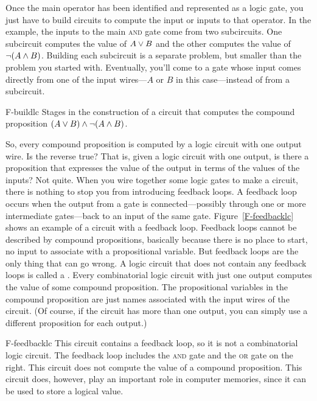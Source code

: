 Once the main operator has been identified and represented as
a logic gate, you just have to build circuits to compute the
input or inputs to that operator.  In the  example,
the inputs to the main \textsc{and} gate come from two subcircuits.
One subcircuit computes the value of $A\vee B$ and the other
computes the value of $\lnot(A\wedge B)$.  Building each subcircuit
is a separate problem, but smaller than the problem you started
with.  Eventually, you'll come to a gate whose input comes directly
from one of the input wires---$A$ or $B$ in this case---instead of
from a subcircuit.


\fig
   {F-buildlc}
   {Stages in the construction of a circuit that computes
    the compound proposition $(A\vee B)\wedge\lnot(A\wedge B)$.}
   {}
   
\medbreak
   
So, every compound proposition is computed by a logic circuit
with one output wire.  Is the reverse true?  That is, given
a logic circuit with one output, is there a proposition that
expresses the value of the output in terms of the values of
the inputs?  Not quite.  When you wire together some logic
gates to make a circuit, there is nothing to stop you from
introducing feedback loops.  A feedback loop occurs when
the output from a gate is connected---possibly through one
or more intermediate gates---back to an input of the same gate.
Figure~\ref{F-feedbacklc} shows an example of a circuit with
a feedback loop.
Feedback loops cannot be described by compound propositions,
basically because there is no place to start, no input to
associate with a propositional variable.  But feedback
loops are the only thing that can go wrong.  A logic circuit
that does not contain any feedback loops is called a
.  Every combinatorial
logic circuit with just one output computes the value of
some compound proposition.  The propositional variables in
the compound proposition are just names associated with
the input wires of the circuit.  (Of course, if the circuit has
more than one output, you can simply use a different proposition
for each output.)  

\fig
   {F-feedbacklc}
   {This circuit contains a feedback loop, so it is not a
    combinatorial logic circuit.  The feedback loop includes
    the \textsc{and} gate and the \textsc{or} gate on the right.
    This circuit does not compute the value of a compound proposition.
    This circuit does, however, play an important role in computer
    memories, since it can be used to store a logical value.}
   {}

